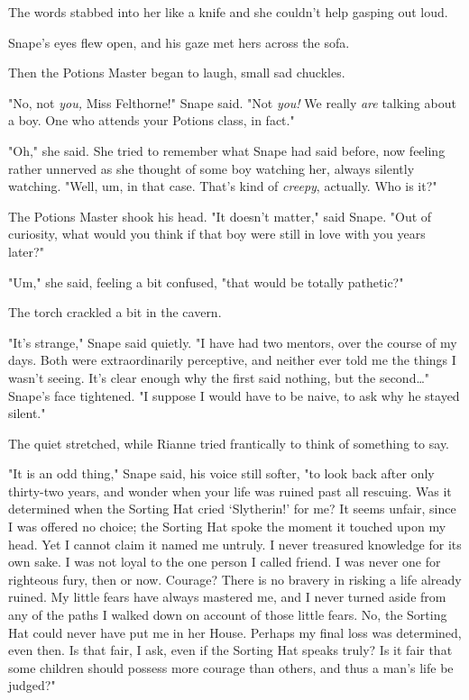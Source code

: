 The words stabbed into her like a knife and she couldn't help gasping out loud.

Snape's eyes flew open, and his gaze met hers across the sofa.

Then the Potions Master began to laugh, small sad chuckles.

"No, not \emph{you,} Miss Felthorne!" Snape said. "Not \emph{you!} We really
\emph{are} talking about a boy. One who attends your Potions class, in fact."

"Oh," she said. She tried to remember what Snape had said before, now feeling
rather unnerved as she thought of some boy watching her, always silently
watching. "Well, um, in that case. That's kind of \emph{creepy}, actually. Who
is it?"

The Potions Master shook his head. "It doesn't matter," said Snape. "Out of
curiosity, what would you think if that boy were still in love with you years
later?"

"Um," she said, feeling a bit confused, "that would be totally pathetic?"

The torch crackled a bit in the cavern.

"It's strange," Snape said quietly. "I have had two mentors, over the course of
my days. Both were extraordinarily perceptive, and neither ever told me the
things I wasn't seeing. It's clear enough why the first said nothing, but the
second{\ldots}" Snape's face tightened. "I suppose I would have to be naive, to
ask why he stayed silent."

The quiet stretched, while Rianne tried frantically to think of something to
say.

"It is an odd thing," Snape said, his voice still softer, "to look back after
only thirty-two years, and wonder when your life was ruined past all rescuing.
Was it determined when the Sorting Hat cried `Slytherin!' for me? It seems
unfair, since I was offered no choice; the Sorting Hat spoke the moment it
touched upon my head. Yet I cannot claim it named me untruly. I never treasured
knowledge for its own sake. I was not loyal to the one person I called friend.
I was never one for righteous fury, then or now. Courage? There is no bravery
in risking a life already ruined. My little fears have always mastered me, and
I never turned aside from any of the paths I walked down on account of those little
fears. No, the Sorting Hat could never have put me in her House. Perhaps my
final loss was determined, even then. Is that fair, I ask, even if the Sorting
Hat speaks truly? Is it fair that some children should possess more courage
than others, and thus a man's life be judged?"

